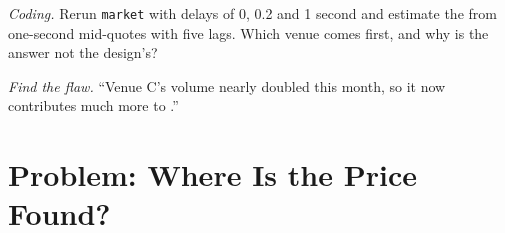 \begin{exercise}[$\star\star\star$]\label{exo:mx:fragmentation-and-routing:7}
\emph{Coding.} Rerun \texttt{market} with delays of 0, 0.2 and 1 second and estimate the  from one-second mid-quotes with five
lags. Which venue comes first, and why is the answer not the design's?
\end{exercise}

\begin{exercise}[$\star\star\star$]\label{exo:mx:fragmentation-and-routing:8}
\emph{Find the flaw.} ``Venue C's volume nearly doubled this month, so it now contributes much more to .''
\end{exercise}

\section{Problem: Where Is the Price Found?}

